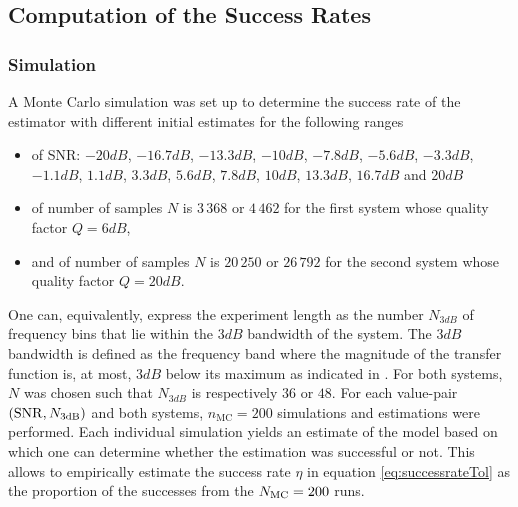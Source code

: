 \subsection{Computation of  the Success Rates}\label{se:CompuSR}

\subsubsection{Simulation}
A Monte Carlo simulation was set up to determine the success rate of the estimator with different initial estimates for the following ranges %
\begin{itemize}
\item of SNR: 
              $-20   \unit{dB}$, 
              $-16.7 \unit{dB}$, 
              $-13.3 \unit{dB}$, 
              $-10   \unit{dB}$, 
              $- 7.8 \unit{dB}$, 
              $- 5.6 \unit{dB}$, 
              $- 3.3 \unit{dB}$, 
              $- 1.1 \unit{dB}$, 
              $  1.1 \unit{dB}$, 
              $  3.3 \unit{dB}$, 
              $  5.6 \unit{dB}$, 
              $  7.8 \unit{dB}$, 
              $ 10   \unit{dB}$, 
              $ 13.3 \unit{dB}$, 
              $ 16.7 \unit{dB}$ and
              $ 20   \unit{dB}$
\item of number of samples $N$ is $3\,368$ or $4\,462$ for the first system whose quality factor $Q= 6 \unit{dB}$,
\item and of number of samples $N$ is $20\,250$ or $26\,792$ for the second system whose quality factor $Q = 20\unit{dB}$.
\end{itemize}
One can, equivalently, express the experiment length as the number $N_{3\unit{dB}}$ of frequency bins that lie within the $3\unit{dB}$ bandwidth of the system.
The $3\unit{dB}$ bandwidth is defined as the frequency band where the magnitude of the transfer function is, at most, $3\unit{dB}$ below its maximum as indicated in .
For both systems, $N$ was chosen such that $N_{3\unit{dB}}$ is respectively $36$ or $48$.
For each value-pair $(\mathrm{SNR}, N_{3\mathrm{dB}})$ and both systems, $n_{\mathrm{MC}} = 200$  simulations and estimations were performed.
Each individual simulation yields an estimate of the model based on which one can determine whether the estimation was successful or not.
This allows to empirically estimate the success rate $\eta$ in equation \eqref{eq:successrateTol} as the proportion of the successes from the $N_{\mathrm{MC}} = 200$ runs.


